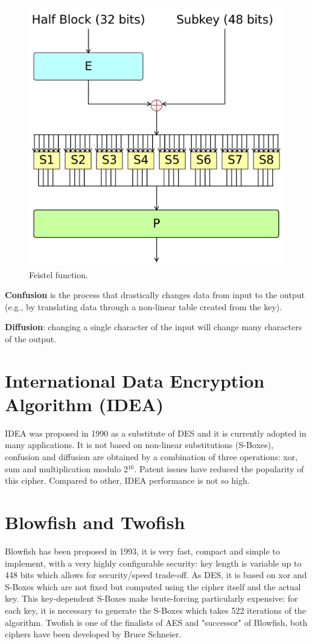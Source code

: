 \documentclass[a4paper, 12pt]{report}
\begin{document}
\begin{figure}[H]
	\centering
	\includegraphics[scale=0.15]{images/Lec10/feistel.png}
	\caption{Feistel function.}
	\label{fig:feistel}
\end{figure}
\textbf{Confusion} is the process that drastically changes data from input to the output (e.g., by translating data through a non-linear table created from the key).

\textbf{Diffusion}: changing a single character of the input will change many characters of the output. 

\section*{International Data Encryption Algorithm (IDEA)}
IDEA was proposed in 1990 as a substitute of DES and it is currently adopted in many applications. It is not based on non-linear substitutions (S-Boxes), confusion and diffusion are obtained by a combination of three operations: xor, sum and multiplication modulo 2$^{16}$. Patent issues have reduced the popularity of this cipher. Compared to other, IDEA performance is not so high.

\section*{Blowfish and Twofish}
Blowfish has been proposed in 1993, it is very fast, compact and simple to implement, with a very highly configurable security: key length is variable up to 448 bits which allows for security/speed trade-off. As DES, it is based on xor and S-Boxes which are not fixed but computed using the cipher itself and the actual key. This key-dependent S-Boxes make brute-forcing particularly expensive: for each key, it is necessary to generate the S-Boxes which takes 522 iterations of the algorithm. Twofish is one of the finalists of AES and "successor" of Blowfish, both ciphers have been developed by Bruce Schneier.
\end{document}
